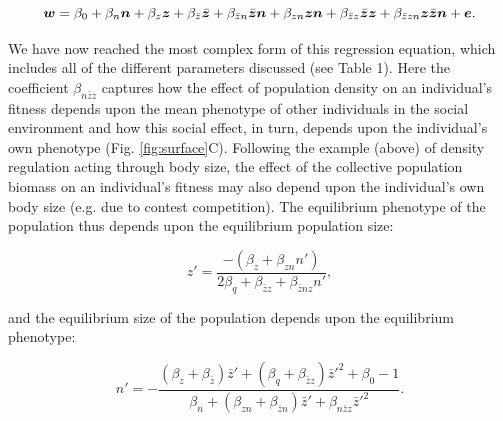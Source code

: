 \documentclass{article}
\begin{document}
\begin{equation} 
\vectorsym{w}=\beta_{0} +\beta_{n} \vectorsym{n} + \beta_{z} \vectorsym{z}+ \beta_{\bar{z}} \vectorsym{\bar{z}}  +   \beta_{\bar{z}n} \vectorsym{\bar{z}n} +   \beta_{zn} \vectorsym{zn} + \beta_{\bar{z}z} \vectorsym{\bar{z}z}   +   \beta_{\bar{z}zn} \vectorsym{z\bar{z}n} + \vectorsym{e}.
\end{equation}

\noindent We have now reached the most complex form of this regression equation, which includes all of the different parameters discussed (see Table 1). Here the coefficient $\beta_{n\bar{z}z}$ captures how the effect of population density on an individual's fitness depends upon the mean phenotype of other individuals in the social environment and how this social effect, in turn, depends upon the individual's own phenotype (Fig. \ref{fig:surface}C). Following the example (above) of density regulation acting through body size, the effect of the collective population biomass on an individual's fitness may also depend upon the individual's own body size (e.g. due to contest competition). The equilibrium phenotype of the population thus depends upon the equilibrium population size: 

\begin{equation} 
z'=\frac{-(\beta_{z}+\beta_{zn}n')}{2\beta_{q} + \beta_{\bar{z}z} + \beta_{\bar{z}nz}n'},
\end{equation} 

\noindent and the equilibrium size of the population depends upon the equilibrium phenotype:

\begin{equation}  \label{eq: full}
	n' = -\frac{(\beta_{z}  +  \beta_{\bar{z}})\bar{z}' + (\beta_{q} + \beta_{\bar{z}z})\bar{z}'^2 +\beta_{0} -1}{\beta_{n} + (\beta_{zn} + \beta_{\bar{z}n}) \bar{z}' +  \beta_{n\bar{z}z}\bar{z}'^2}.
\end{equation}
\end{document}
